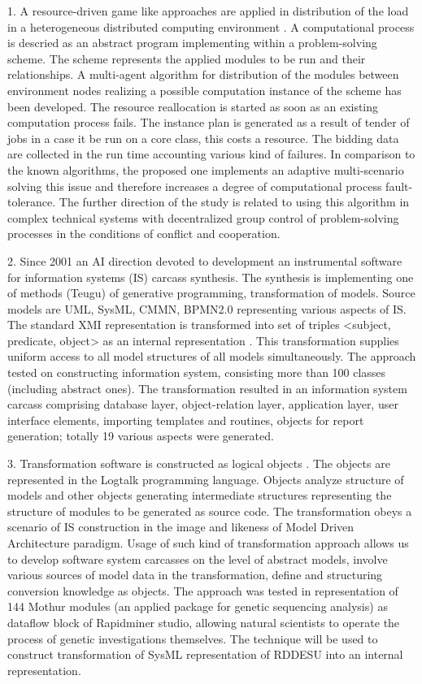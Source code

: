 \documentclass[runningheads]{llncs}
\begin{document}
    1. A resource-driven game like approaches are applied in distribution of the load in a heterogeneous distributed computing environment \cite{b1}. A computational process is descried as an abstract program implementing within a problem-solving scheme. The scheme represents the applied modules to be run and their relationships. A multi-agent algorithm for distribution of the modules between environment nodes realizing a possible computation instance of the scheme has been developed. The resource reallocation is started as soon as an existing computation process fails. The instance plan is generated as a result of tender of jobs in a case it be run on a core class, this costs a resource. The bidding data are collected in the run time accounting various kind of failures. In comparison to the known algorithms, the proposed one implements an adaptive multi-scenario solving this issue and therefore increases a degree of computational process fault-tolerance. The further direction of the study is related to using this algorithm in complex technical systems with decentralized group control of problem-solving processes in the conditions of conflict and cooperation.

    2. Since 2001 an AI direction devoted to development an instrumental software for information systems (IS) carcass synthesis. The synthesis is implementing one of methods (Teugu) of generative programming, transformation of models. Source models are UML, SysML, CMMN, BPMN2.0 representing various aspects of IS. The standard XMI representation is transformed into set of triples <subject, predicate, object> as an internal representation \cite{b2}. This transformation supplies uniform access to all model structures of all models simultaneously. The approach tested on constructing information system, consisting more than 100 classes (including abstract ones). The transformation resulted in an information system carcass comprising database layer, object-relation layer, application layer, user interface elements, importing templates and routines, objects for report generation; totally 19 various aspects were generated.

    3. Transformation software is constructed as logical objects \cite{b3}. The objects are represented in the Logtalk programming language. Objects analyze structure of models and other objects generating intermediate structures representing the structure of modules to be generated as source code. The transformation obeys a scenario of IS construction in the image and likeness of Model Driven Architecture paradigm. Usage of such kind of transformation approach allows us to develop software system carcasses on the level of abstract models, involve various sources of model data in the transformation, define and structuring conversion knowledge as objects. The approach was tested in representation of 144 Mothur modules (an applied package for genetic sequencing analysis) as dataflow block of Rapidminer studio, allowing natural scientists to operate the process of genetic investigations themselves. The technique will be used to construct transformation of SysML representation of RDDESU into an internal representation.
\end{document}
